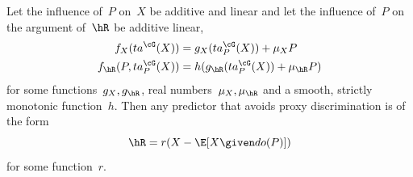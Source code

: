 \begin{theorem*}
  Let the influence of~$P$ on~$X$ be additive and linear and let the influence
  of~$P$ on the argument of~$\hR$ be additive linear, \ie{}
  \begin{align*}
    f_X (ta^{\cG}(X)) &= g_X(ta^{\cG}_P(X)) + \mu_X P \\
    f_{\hR} (P, ta^{\cG}_P(X)) &= h(g_{\hR}(ta^{\cG}_P(X)) + \mu_{\hR} P)
  \end{align*}
  for some functions~$g_X, g_{\hR}$, real numbers~$\mu_X, \mu_{\hR}$ and a
  smooth, strictly monotonic function~$h$. Then any predictor that avoids proxy
  discrimination is of the form
  \begin{equation*}
    {\hR} = r(X - \E[X \given do(P)])
  \end{equation*}
  for some function~$r$.
\end{theorem*}

